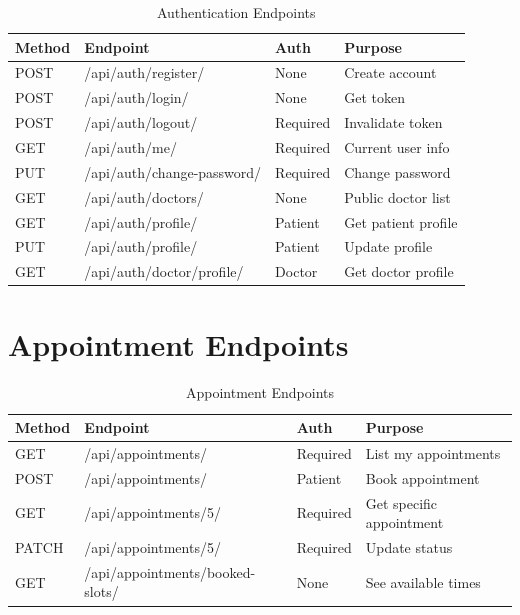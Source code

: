 \documentclass[11pt,a4paper,twoside]{report}
\begin{document}
\begin{table}[H]
\centering
\small
\begin{tabular}{|l|l|p{3cm}|p{3cm}|}
\hline
\textbf{Method} & \textbf{Endpoint} & \textbf{Auth} & \textbf{Purpose} \\
\hline
POST & /api/auth/register/ & None & Create account \\
\hline
POST & /api/auth/login/ & None & Get token \\
\hline
POST & /api/auth/logout/ & Required & Invalidate token \\
\hline
GET & /api/auth/me/ & Required & Current user info \\
\hline
PUT & /api/auth/change-password/ & Required & Change password \\
\hline
GET & /api/auth/doctors/ & None & Public doctor list \\
\hline
GET & /api/auth/profile/ & Patient & Get patient profile \\
\hline
PUT & /api/auth/profile/ & Patient & Update profile \\
\hline
GET & /api/auth/doctor/profile/ & Doctor & Get doctor profile \\
\hline
\end{tabular}
\caption{Authentication Endpoints}
\end{table}

\section{Appointment Endpoints}

\begin{table}[H]
\centering
\small
\begin{tabular}{|l|l|p{3cm}|p{3cm}|}
\hline
\textbf{Method} & \textbf{Endpoint} & \textbf{Auth} & \textbf{Purpose} \\
\hline
GET & /api/appointments/ & Required & List my appointments \\
\hline
POST & /api/appointments/ & Patient & Book appointment \\
\hline
GET & /api/appointments/5/ & Required & Get specific appointment \\
\hline
PATCH & /api/appointments/5/ & Required & Update status \\
\hline
GET & /api/appointments/booked-slots/ & None & See available times \\
\hline
\end{tabular}
\caption{Appointment Endpoints}
\end{table}
\end{document}
